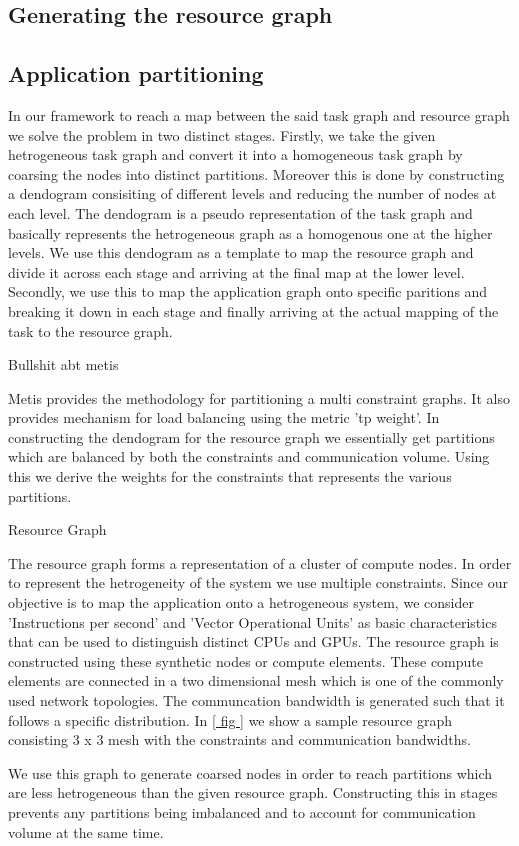 \subsection{Generating the resource graph}
\label{sec:gener-reso-graph}


\subsection{Application partitioning}
\label{sec:appl-part}

In our framework to reach a map between the said task graph and resource
graph we solve the problem in two distinct stages. Firstly, we take the
given hetrogeneous task graph and convert it into a homogeneous task
graph by coarsing the nodes into distinct partitions. Moreover this is
done by constructing a dendogram consisiting of different levels and
reducing the number of nodes at each level. The dendogram is a pseudo
representation of the task graph and basically represents the
hetrogeneous graph as a homogenous one at the higher levels. We use this
dendogram as a template to map the resource graph and divide it across
each stage and arriving at the final map at the lower level. Secondly,
we use this to map the application graph onto specific paritions and
breaking it down in each stage and finally arriving at the actual
mapping of the task to the resource graph.

Bullshit abt metis

Metis provides the methodology for partitioning a multi constraint
graphs. It also provides mechanism for load balancing using the metric
'tp weight'. In constructing the dendogram for the resource graph we
essentially get partitions which are balanced by both the constraints
and communication volume. Using this we derive the weights for the
constraints that represents the various partitions.

Resource Graph

The resource graph forms a representation of a cluster of compute
nodes. In order to represent the hetrogeneity of the system we use
multiple constraints. Since our objective is to map the application onto
a hetrogeneous system, we consider 'Instructions per second' and 'Vector
Operational Units' as basic characteristics that can be used to
distinguish distinct CPUs and GPUs. The resource graph is constructed
using these synthetic nodes or compute elements. These compute elements
are connected in a two dimensional mesh which is one of the commonly
used network topologies. The communcation bandwidth is generated such
that it follows a specific distribution. In \ref{ fig } we show a sample
resource graph consisting 3 x 3 mesh with the constraints and
communication bandwidths.

We use this graph to generate coarsed nodes in order to reach partitions
which are less hetrogeneous than the given resource graph. Constructing
this in stages prevents any partitions being imbalanced and to account
for communication volume at the same time.
